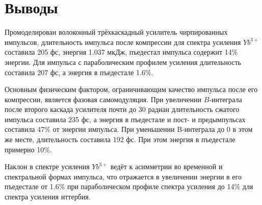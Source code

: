 \documentclass[12pt]{article}
\begin{document}
\clearpage
\section{Выводы}

Промоделирован волоконный трёхкаскадный усилитель чирпированных импульсов, длительность импульса
после компрессии для спектра усиления $Yb^{3+}$ составила 205 фс, энергия 1.037 мкДж, пъедестал импульса содержит
14\% энергии. Для импульса с параболическим профилем усиления длительность составила 207 фс, а энергия в пъедестале
1.6\%.

Основным физическим фактором, ограничивающим качество импульса после его компрессии, является фазовая самомодуляция.
При увеличении $B$-интеграла после второго каскада усилителя почти до 30 радиан длительность сжатого
импульса составила 235 фс, а энергия в пъедестале и пост- и предымпульсах составила 47\% от энергии импульса.
При уменьшении B-интеграла до 0 в этом же месте, длительность составила 192 фс. При этом энергия в пъедестале примерно 10\%.

Наклон в спектре усиления $Yb^{3+}$ ведёт к асимметрии во временной и спектральной формах импульса, что отражается
в увеличении энергии в его пъедестале от 1.6\% при параболическом профиле спектра усиления до 14\% для спектра
усиления иттербия.

\clearpage


\end{document}

